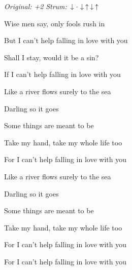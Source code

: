 \begin{song}


\begin{headerbox}
 \quad
\textit{Original: +2} \quad
\textit{Strum:} $\Down\Miss\Down\Up\Down\Up$
\end{headerbox}

\begin{hchordbox}
\end{hchordbox}

\Large

\bigskip

Wise men say, only fools rush in \par
But I can't help falling in love with you 

\bigskip

Shall I stay, would it be a sin? \par
If I can't help falling in love with you 

\bigskip

Like a river flows surely to the sea \par
{}Darling so it goes \par
{}Some things  are meant to be 

\bigskip

Take my hand, take my whole life too \par
For I can't help falling in love with you 

\bigskip

Like a river flows surely to the sea \par
{}Darling so it goes \par
{}Some things  are meant to be 

\bigskip

Take my hand, take my whole life too \par
For I can't help falling in love with you \par
For I can't help falling in love with you \par

\end{song}